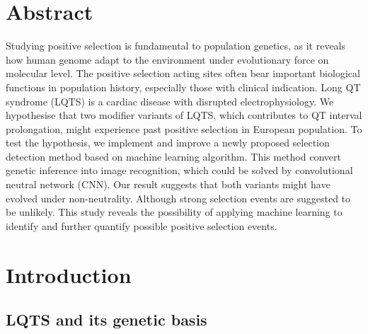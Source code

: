 \documentclass[a4paper,12pt,oneside]{extarticle}
\begin{document}




\setcounter{page}{2}
\section{Abstract}
Studying positive selection is fundamental to population genetics, as it reveals how human genome adapt to the environment under evolutionary force on molecular level. The positive selection acting sites often bear important biological functions in population history, especially those with clinical indication. Long QT syndrome (LQTS) is a cardiac disease with disrupted electrophysiology. We hypothesise that two modifier variants of LQTS, which contributes to QT interval prolongation, might experience past positive selection in European population. To test the hypothesis, we implement and improve a newly proposed selection detection method based on machine learning algorithm. This method convert genetic inference into image recognition, which could be solved by convolutional neutral network (CNN). Our result suggests that both variants might have evolved under non-neutrality. Although strong selection events are suggested to be unlikely. This study reveals the possibility of applying machine learning to identify and further quantify possible positive selection events.


\cleardoublepage\clearpage
\section{Introduction}
\subsection{LQTS and its genetic basis}
\end{document}
